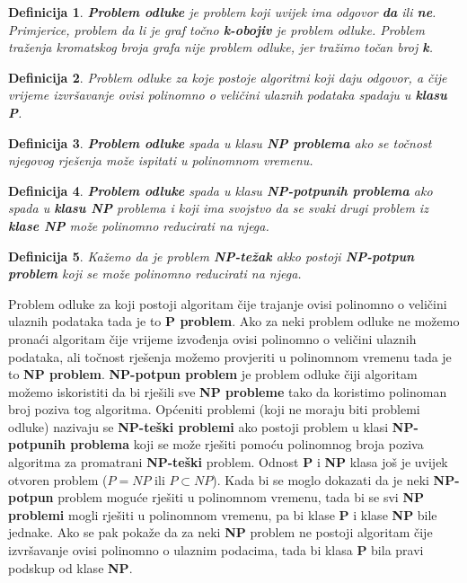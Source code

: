\documentclass[times, utf8, diplomski, numeric]{fer}
\newtheorem{definition}{Definicija}
\begin{document}
\begin{definition}
\textbf{Problem odluke} je problem koji uvijek ima odgovor \textbf{da} ili \textbf{ne}. Primjerice, problem da li je graf točno \textbf{k-obojiv} je problem odluke. Problem traženja kromatskog broja grafa nije problem odluke, jer tražimo točan broj \textbf{k}.
\end{definition}

\begin{definition}
Problem odluke za koje postoje algoritmi koji daju odgovor, a čije vrijeme izvršavanje ovisi polinomno o veličini ulaznih podataka spadaju u \textbf{klasu P}.
\end{definition}

\begin{definition}
\textbf{Problem odluke} spada u klasu \textbf{NP problema} ako se točnost njegovog rješenja može ispitati u polinomnom vremenu. 
\end{definition}

\begin{definition}
\textbf{Problem odluke} spada u klasu \textbf{NP-potpunih problema} ako spada u \textbf{klasu NP} problema i koji ima svojstvo da se svaki drugi problem iz \textbf{klase NP} može polinomno reducirati na njega. 
\end{definition}

\begin{definition}
Kažemo da je problem \textbf{NP-težak} akko postoji \textbf{NP-potpun problem} koji se može polinomno reducirati na njega.
\end{definition}

Problem odluke za koji postoji algoritam čije trajanje ovisi polinomno o veličini ulaznih podataka tada je to \textbf{P problem}. Ako za neki problem odluke ne možemo pronaći algoritam čije vrijeme izvođenja ovisi polinomno o veličini ulaznih podataka, ali točnost rješenja možemo provjeriti u polinomnom vremenu tada je to \textbf{NP problem}. \textbf{NP-potpun problem} je problem odluke čiji algoritam možemo iskoristiti da bi rješili sve \textbf{NP probleme} tako da koristimo polinoman broj poziva tog algoritma. Općeniti problemi (koji ne moraju biti problemi odluke) nazivaju se \textbf{NP-teški problemi} ako postoji problem u klasi \textbf{NP-potpunih problema} koji se može rješiti pomoću polinomnog broja poziva algoritma za promatrani \textbf{NP-teški} problem. Odnost \textbf{P} i \textbf{NP} klasa još je uvijek otvoren problem ($P=NP$ ili $P\subset NP$). Kada bi se moglo dokazati da je neki \textbf{NP-potpun} problem moguće rješiti u polinomnom vremenu, tada bi se svi \textbf{NP problemi} mogli rješiti u polinomnom vremenu, pa bi klase \textbf{P} i klase \textbf{NP} bile jednake. Ako se pak pokaže da za neki \textbf{NP} problem ne postoji algoritam čije izvršavanje ovisi polinomno o ulaznim podacima, tada bi klasa \textbf{P} bila pravi podskup od klase \textbf{NP}.  
\end{document}

